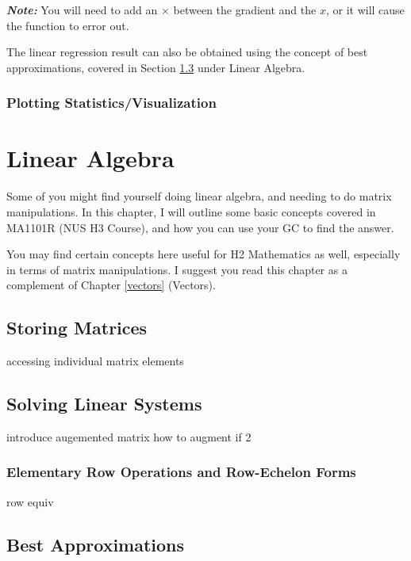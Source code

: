 \documentclass[a5paper,draft]{memoir}
\def\note#1{\textbf{\textit{Note:}} #1}
\begin{document}
\note{You will need to add an $\times$ between the gradient and the $x$, or it will cause the function to error out.}

The linear regression result can also be obtained using the concept of best approximations, covered in Section \ref{bestapprox} under Linear Algebra.

\subsection{Plotting Statistics/Visualization} \label{plotstat}


\chapter{Linear Algebra}
Some of you might find yourself doing linear algebra, and needing to do matrix manipulations. In this chapter, I will outline some basic concepts covered in MA1101R (NUS H3 Course), and how you can use your GC to find the answer.

You may find certain concepts here useful for H2 Mathematics as well, especially in terms of matrix manipulations. I suggest you read this chapter as a complement of Chapter \ref{vectors} (Vectors). 

\section{Storing Matrices}
accessing individual matrix elements

\section{Solving Linear Systems} \label{solvLinSys}
introduce augemented matrix
how to augment if 2

\subsection{Elementary Row Operations and Row-Echelon Forms}
row equiv

\section{Best Approximations} \label{bestapprox}

\printindex
\end{document}
